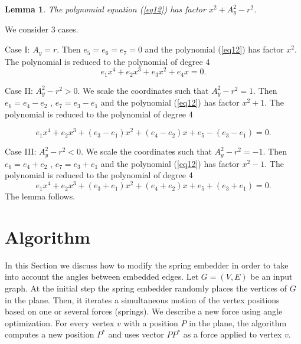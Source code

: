 \documentclass[10pt]{article}
\newtheorem{lemma}[theorem]{Lemma}
\newenvironment{proof}{\begingroup\Proof}{\qed\endgroup}
\def\Proof{\noindent{\bf Proof\/:}\nobreak}
\def\qed{\unskip~{\vrule height 4pt depth 0pt width 4pt}\medbreak}
\begin{document}
\begin{lemma} \label{factor}
The polynomial equation (\ref{eq12}) has factor $x^2+A_y^2-r^2$.
\end{lemma}

\begin{proof}
We consider 3 cases.

Case I: $A_y=r$.
Then $e_5=e_6=e_7=0$ and the polynomial (\ref{eq12}) 
has factor $x^2$. The polynomial is reduced to the polynomial of degree 4
\begin{equation} \label{eqn1}
e_1x^4+e_2x^3+e_3x^2+e_4x=0.
\end{equation}

Case II: $A_y^2-r^2>0$.
We scale the coordinates such that $A_y^2-r^2=1$.
Then $e_6=e_4-e_2$ , $e_7=e_3-e_1$ and the polynomial (\ref{eq12}) 
has factor $x^2 + 1$. The polynomial is reduced to the polynomial of degree 4

\begin{equation} \label{eqn2}
e_1x^4+e_2x^3+(e_3-e_1)x^2+(e_4-e_2)x+e_5-(e_3-e_1)=0.
\end{equation}

Case III: $A_y^2-r^2<0$.
We scale the coordinates such that $A_y^2-r^2=-1$.
Then $e_6=e_4+e_2$ , $e_7=e_3+e_1$ and the polynomial (\ref{eq12}) 
has factor $x^2 - 1$. The polynomial is reduced to the polynomial of degree 4
\begin{equation} \label{eqn3}
e_1x^4+e_2x^3+(e_3+e_1)x^2+(e_4+e_2)x+e_5+(e_3+e_1)=0.
\end{equation}
The lemma follows.
\end{proof}











\section{Algorithm} \label{algorithm}

In this Section we discuss how to modify the spring embedder in order to take into account 
the angles between embedded edges. 
Let $G=(V,E)$ be an input graph. 
At the initial step the spring embedder randomly places the vertices of $G$ in the plane.
Then, it iterates a simultaneous motion of the vertex positions based on
one or several forces (springs). 
We describe a new force using angle optimization.
For every vertex $v$ with a position $P$ in the plane, the algorithm computes 
a new position $P^*$ and uses vector $PP^*$ as a force applied to vertex $v$.
\end{document}
